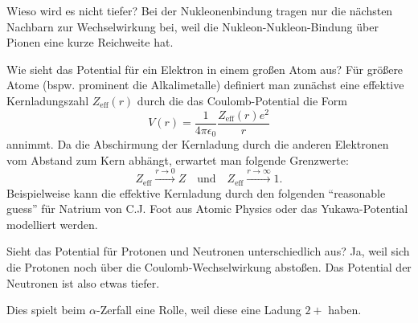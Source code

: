 \begin{fquestion}{Wieso wird es nicht tiefer?}
    Bei der Nukleonenbindung tragen nur die nächsten Nachbarn zur Wechselwirkung bei, weil die Nukleon-Nukleon-Bindung über Pionen eine kurze Reichweite hat.
\end{fquestion}

\begin{fquestion}{Wie sieht das Potential für ein Elektron in einem großen Atom aus?}
    Für größere Atome (bspw. prominent die Alkalimetalle) definiert man zunächst eine effektive Kernladungszahl $Z_{\mathrm{eff}}(r)$ durch die das Coulomb-Potential die Form
    $$V(r) = \frac{1}{4\pi\epsilon_0} \frac{Z_{\mathrm{eff}}(r) e^2}{r}$$
    annimmt.
    Da die Abschirmung der Kernladung durch die anderen Elektronen vom Abstand zum Kern abhängt, erwartet man folgende Grenzwerte:
    $$Z_{\mathrm{eff}} \xrightarrow{r \rightarrow 0} Z \quad\text{und} \quad Z_{\mathrm{eff}} \xrightarrow{r \rightarrow \infty} 1.$$
    Beispielweise kann die effektive Kernladung durch den folgenden ``reasonable guess'' für Natrium von C.J. Foot aus Atomic Physics oder das Yukawa-Potential modelliert werden.
    \begin{center}
    \end{center}
\end{fquestion}

\begin{fquestion}{Sieht das Potential für Protonen und Neutronen unterschiedlich aus?}
    Ja, weil sich die Protonen noch über die Coulomb-Wechselwirkung abstoßen. 
    Das Potential der Neutronen ist also etwas tiefer.
    
    Dies spielt beim $\alpha$-Zerfall eine Rolle, weil diese eine Ladung $2+$ haben.
\end{fquestion}

